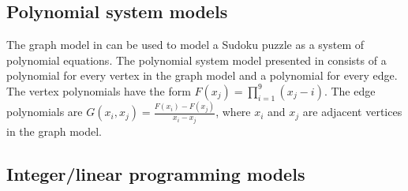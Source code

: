 \subsection{Polynomial system models}
\label{sec:models:polynomials}

The graph model in \cite{gagovargaset} can be used to model a Sudoku puzzle as a system of polynomial equations. The polynomial system model presented in \cite{gagovargaset} consists of a polynomial for every vertex in the graph model and a polynomial for every edge. The vertex polynomials have the form $F(x_j) = \prod_{i=1}^{9} (x_j - i)$. The edge polynomials are $G(x_i, x_j) = \frac{F(x_i) - F(x_j)}{x_i - x_j}$, where $x_i$ and $x_j$ are adjacent vertices in the graph model. 

\subsection{Integer/linear programming models}
\label{sec:models:lp}


